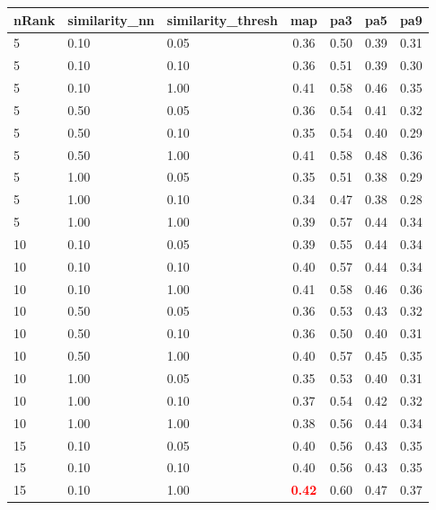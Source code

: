 \documentclass[12pt,a4paper,fleqn]{tufte-handout}
\begin{document}
 
\begin{table}                 
\begin{center}                 
\scriptsize                 
\setlength{\tabcolsep}{.16667em}                 
\begin{tabular}{lllcccc}                 
nRank & similarity\_nn & similarity\_thresh & map & pa3 & pa5 & pa9 \\                 
\hline                 
5 & 0.10 & 0.05 & 0.36 & 0.50 & 0.39 & 0.31 \\                 
5 & 0.10 & 0.10 & 0.36 & 0.51 & 0.39 & 0.30 \\                 
5 & 0.10 & 1.00 & 0.41 & 0.58 & 0.46 & 0.35 \\                 
5 & 0.50 & 0.05 & 0.36 & 0.54 & 0.41 & 0.32 \\                 
5 & 0.50 & 0.10 & 0.35 & 0.54 & 0.40 & 0.29 \\                 
5 & 0.50 & 1.00 & 0.41 & 0.58 & 0.48 & 0.36 \\                 
5 & 1.00 & 0.05 & 0.35 & 0.51 & 0.38 & 0.29 \\                 
5 & 1.00 & 0.10 & 0.34 & 0.47 & 0.38 & 0.28 \\                 
5 & 1.00 & 1.00 & 0.39 & 0.57 & 0.44 & 0.34 \\                 
10 & 0.10 & 0.05 & 0.39 & 0.55 & 0.44 & 0.34 \\                 
10 & 0.10 & 0.10 & 0.40 & 0.57 & 0.44 & 0.34 \\                 
10 & 0.10 & 1.00 & 0.41 & 0.58 & 0.46 & 0.36 \\                 
10 & 0.50 & 0.05 & 0.36 & 0.53 & 0.43 & 0.32 \\                 
10 & 0.50 & 0.10 & 0.36 & 0.50 & 0.40 & 0.31 \\                 
10 & 0.50 & 1.00 & 0.40 & 0.57 & 0.45 & 0.35 \\                 
10 & 1.00 & 0.05 & 0.35 & 0.53 & 0.40 & 0.31 \\                 
10 & 1.00 & 0.10 & 0.37 & 0.54 & 0.42 & 0.32 \\                 
10 & 1.00 & 1.00 & 0.38 & 0.56 & 0.44 & 0.34 \\                 
15 & 0.10 & 0.05 & 0.40 & 0.56 & 0.43 & 0.35 \\                 
15 & 0.10 & 0.10 & 0.40 & 0.56 & 0.43 & 0.35 \\                 
15 & 0.10 & 1.00 & \textbf{\textcolor{red}{0.42}} & 0.60 & 0.47 & 0.37 \\                 

\end{tabular}
\end{center}
\end{table}
\end{document}
